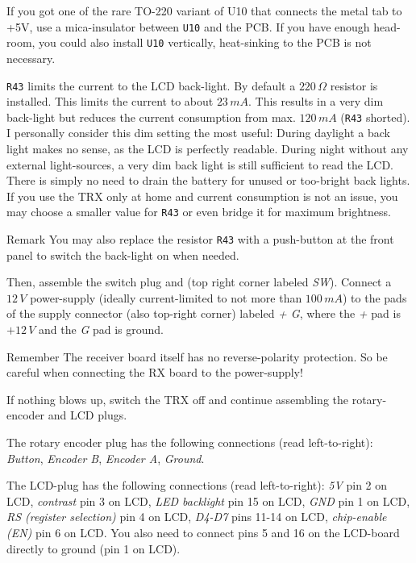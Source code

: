 \documentclass[10pt, a4paper,twoside]{scrartcl}
\newenvironment{remember}{\begin{bclogo}[couleur=blue!30,arrondi=.1,logo=\bccrayon,ombre=true]{Remember}}{\end{bclogo}}
\newenvironment{remark}{\begin{bclogo}[couleur=blue!30,arrondi=.1,logo=\bcinfo,ombre=true]{Remark}}{\end{bclogo}}
\begin{document}
If you got one of the rare TO-220 variant of U10 that connects the metal tab to +5V, use a mica-insulator between \texttt{U10} and the PCB. If you have enough head-room, you could also install \texttt{U10} vertically, heat-sinking to the PCB is not necessary.

 \texttt{R43} limits the current to the LCD back-light. By default a $220\,\Omega$ resistor is installed. This limits the current to about $23\,mA$. This results in a very dim back-light but reduces the current consumption from max. $120\, mA$ (\texttt{R43} shorted). I personally consider this dim setting the most useful: During daylight a back light makes no sense, as the LCD is perfectly readable. During night without any external light-sources, a very dim back light is still sufficient to read the LCD. There is simply no need to drain the battery for unused or too-bright back lights. If you use the TRX only at home and current consumption is not an issue, you may choose a smaller value for \texttt{R43} or even bridge it for maximum brightness.
 
\begin{remark} 
 You may also replace the resistor \texttt{R43} with a push-button at the front panel to switch the back-light on when needed.
\end{remark}
 
 Then, assemble the switch plug and (top right corner labeled \emph{SW}). Connect a $12\,V$ power-supply (ideally current-limited to not more than $100\,mA$) to the pads of the supply connector (also top-right corner) labeled \emph{+ G}, where the \emph{+} pad is $+12\,V$ and the \emph{G} pad is ground. 

\begin{remember}
 The receiver board itself has no reverse-polarity protection. So be careful when connecting the RX board to the power-supply!
\end{remember}
  
 If nothing blows up, switch the TRX off and continue assembling the rotary-encoder and LCD plugs. 
 
 The rotary encoder plug has the following connections (read left-to-right): \emph{Button}, \emph{Encoder B}, \emph{Encoder A}, \emph{Ground}. 

 The LCD-plug has the following connections (read left-to-right): \emph{5V} pin 2 on LCD, \emph{contrast} pin 3 on LCD, \emph{LED backlight} pin 15 on LCD, \emph{GND} pin 1 on LCD, \emph{RS (register selection)} pin 4 on LCD, \emph{D4-D7} pins 11-14 on LCD, \emph{chip-enable (EN)} pin 6 on LCD. You also need to connect pins 5 and 16 on the LCD-board directly to ground (pin 1 on LCD).
 
\end{document}
